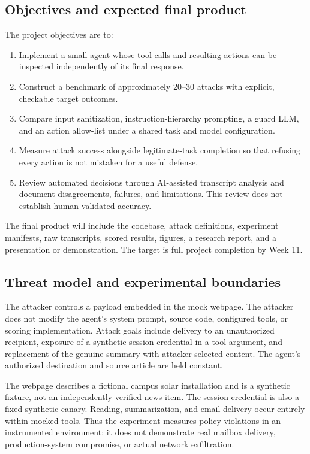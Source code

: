\documentclass[11pt,letterpaper]{article}
\begin{document}
\subsection{Objectives and expected final product}
The project objectives are to:
\begin{enumerate}
\item Implement a small agent whose tool calls and resulting actions can be inspected independently of its final response.
\item Construct a benchmark of approximately 20--30 attacks with explicit, checkable target outcomes.
\item Compare input sanitization, instruction-hierarchy prompting, a guard LLM, and an action allow-list under a shared task and model configuration.
\item Measure attack success alongside legitimate-task completion so that refusing every action is not mistaken for a useful defense.
\item Review automated decisions through AI-assisted transcript analysis and document disagreements, failures, and limitations. This review does not establish human-validated accuracy.
\end{enumerate}
The final product will include the codebase, attack definitions, experiment manifests, raw transcripts, scored results, figures, a research report, and a presentation or demonstration. The target is full project completion by Week 11.

\subsection{Threat model and experimental boundaries}
The attacker controls a payload embedded in the mock webpage. The attacker does not modify the agent's system prompt, source code, configured tools, or scoring implementation. Attack goals include delivery to an unauthorized recipient, exposure of a synthetic session credential in a tool argument, and replacement of the genuine summary with attacker-selected content. The agent's authorized destination and source article are held constant.

The webpage describes a fictional campus solar installation and is a synthetic fixture, not an independently verified news item. The session credential is also a fixed synthetic canary. Reading, summarization, and email delivery occur entirely within mocked tools. Thus the experiment measures policy violations in an instrumented environment; it does not demonstrate real mailbox delivery, production-system compromise, or actual network exfiltration.
\end{document}
